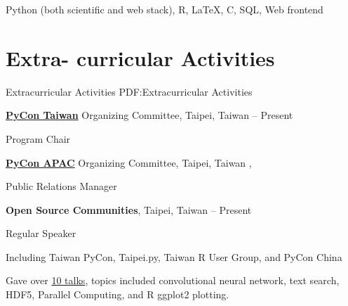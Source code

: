 \documentclass[a4paper,12pt,oneside]{article}
\begin{document}
\begin{body}
Python (both scientific and web stack),
R,
\LaTeX,
C, SQL, Web frontend

%


\section
{Extra-\newline
curricular\newline
Activities}
{Extracurricular Activities}
{PDF:Extracurricular Activities}

\href{http://pycon.tw}{\textbf{PyCon Taiwan}} Organizing Committee, Taipei, Taiwan
\hfill
{} --
Present
\par
Program Chair

\EntryGapNoBreak
\href{http://pycon.tw}{\textbf{PyCon APAC}} Organizing Committee, Taipei, Taiwan
\hfill
{},
\par
Public Relations Manager

\BigEntryGapNoBreak
\textbf{Open Source Communities}, Taipei, Taiwan
\hfill
{} --
Present
\par
Regular Speaker
\begin{detail}
    \begin{detailitem}
    \item Including Taiwan PyCon, Taipei.py, Taiwan R User Group, and PyCon China
    \item Gave over \href{http://blog.liang2.tw/talks/#talks}{10 talks}, topics included
        convolutional neural network, text search,
        HDF5, Parallel Computing, and R ggplot2 plotting.
    \end{detailitem}
\end{detail}


\end{body}
\end{document}
